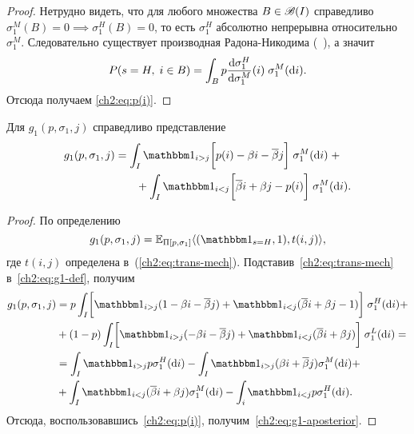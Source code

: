 {\begin{proof}
  Нетрудно видеть, что для любого множества $B \in \mathscr{B}(I)$ справедливо $\sigma^M_1(B) = 0 \implies \sigma^H_1(B) = 0$, то есть $\sigma^H_1$ абсолютно непрерывна относительно $\sigma^M_1$.
  Следовательно существует производная Радона-Никодима (\seename~\cite{kolmogorov-fomin}), а значит
  \begin{equation*}
    P(s = H, \; i \in B) =
    \int_B p \frac{\mathop{}\!\mathrm{d} \sigma^H_1}{\mathop{}\!\mathrm{d} \sigma^M_1}(i) \; \sigma^M_1(\mathop{}\!\mathrm{d} i).
  \end{equation*}
  Отсюда получаем \eqref{ch2:eq:p(i)}.
\end{proof}

\begin{proposition}
  Для $g_1(p, \sigma_1, j)$ справедливо представление
  \begin{equation}\label{ch2:eq:g1-aposterior}
    \begin{multlined}
      g_1(p, \sigma_1, j) = \int_I \Ind{i > j} \biggl[ p(i) - \Co i -
      \DCo j
      \biggr] \; \sigma^M_1(\di i) \; + \\
      + \int_I \Ind{i < j} \biggl[ \DCo i + \Co j - p(i) \biggr] \;
      \sigma^M_1(\di i).
    \end{multlined}
  \end{equation}
\end{proposition}
\begin{proof}
  По определению
  \begin{equation}\label{ch2:eq:g1-def}
    g_1(p, \sigma_1, j) = \E_{\Pi[p, \sigma_1]} \langle
    (\Ind{s = H}, 1), t(i, j)
    \rangle,
  \end{equation}
  где $t(i, j)$ определена в~(\ref{ch2:eq:trans-mech}).
  Подставив~\eqref{ch2:eq:trans-mech} в~\eqref{ch2:eq:g1-def}, получим
  \begin{align*}
    g_1(p, \sigma_1, j) 
    &= p \int_I \biggl[ \Ind{i > j}(1 - \Co i - \DCo j) + \Ind{i < j} (\DCo i + \Co j - 1) \biggr] \; \sigma^H_1(\di i) + \\
    &+ (1-p) \int_I \biggl[
      \Ind{i > j} (- \Co i - \DCo j) + \Ind{i < j}(\DCo i + \Co j) 
    \biggr]
    \; \sigma^L_1(\di i) = \\
    &= \int_I \Ind{i > j} p \sigma^H_1(\di i) -
    \int_I \Ind{i > j} (\Co i + \DCo j) \sigma^M_1 (\di i) + \\
    &+ \int_I \Ind{i < j} (\DCo i + \Co j) \sigma^M_1 (\di i) -
    \int_i \Ind{i < j} p \sigma^H_1(\di i).
  \end{align*}
  Отсюда, воспользовавшись~\eqref{ch2:eq:p(i)}, получим~\eqref{ch2:eq:g1-aposterior}.
\end{proof}

}
